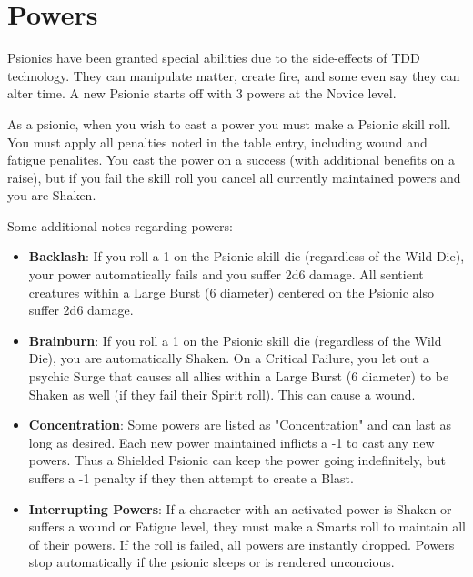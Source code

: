 \documentclass[10pt,twoside]{article}
\begin{document}

    \section{Powers}

    \begin{multicols}{2}

        Psionics have been granted special abilities due to the side-effects of TDD technology. They can manipulate matter, create fire, and some even say they can alter time. A new Psionic starts off with 3 powers at the Novice level.

        As a psionic, when you wish to cast a power you must make a Psionic skill roll. You must apply all penalties noted in the table entry, including wound and fatigue penalites. You cast the power on a success (with additional benefits on a raise), but if you fail the skill roll you cancel all currently maintained powers and you are Shaken.

        Some additional notes regarding powers:

        \begin{itemize}

            \item \textbf{Backlash}: If you roll a 1 on the Psionic skill die (regardless of the Wild Die), your power automatically fails and you suffer 2d6 damage. All sentient creatures within a Large Burst (6 diameter) centered on the Psionic also suffer 2d6 damage.

            \item \textbf{Brainburn}: If you roll a 1 on the Psionic skill die (regardless of the Wild Die), you are automatically Shaken. On a Critical Failure, you let out a psychic Surge that causes all allies within a Large Burst (6 diameter) to be Shaken as well (if they fail their Spirit roll). This can cause a wound.

            \item \textbf{Concentration}: Some powers are listed as "Concentration" and can last as long as desired. Each new power maintained inflicts a -1 to cast any new powers. Thus a Shielded Psionic can keep the power going indefinitely, but suffers a -1 penalty if they then attempt to create a Blast.

            \item \textbf{Interrupting Powers}: If a character with an activated power is Shaken or suffers a wound or Fatigue level, they must make a Smarts roll to maintain all of their powers. If the roll is failed, all powers are instantly dropped. Powers stop automatically if the psionic sleeps or is rendered unconcious.


\end{itemize}
\end{multicols}
\end{document}
